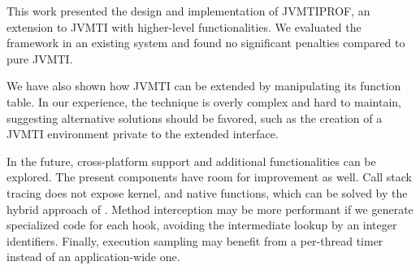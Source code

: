 \label{cap:conclusion}

This work presented the design and implementation of JVMTIPROF, an extension to JVMTI with higher-level functionalities. We evaluated the framework in an existing system and found no significant penalties compared to pure JVMTI.

We have also shown how JVMTI can be extended by manipulating its function table. In our experience, the technique is overly complex and hard to maintain, suggesting alternative solutions should be favored, such as the creation of a JVMTI environment private to the extended interface.

In the future, cross-platform support and additional functionalities can be explored. The present components have room for improvement as well. Call stack tracing does not expose kernel, and native functions, which can be solved by the hybrid approach of . Method interception may be more performant if we generate specialized code for each hook, avoiding the intermediate lookup by an integer identifiers. Finally, execution sampling may benefit from a per-thread timer instead of an application-wide one.
